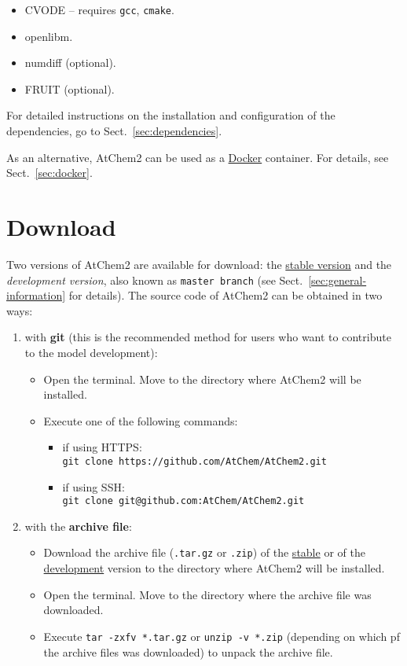 \begin{itemize}
\item CVODE -- requires \texttt{gcc}, \texttt{cmake}. %
\item openlibm.
\item numdiff (optional).
\item FRUIT (optional).
\end{itemize}

For detailed instructions on the installation and configuration of the
dependencies, go to Sect.~\ref{sec:dependencies}.

As an alternative, AtChem2 can be used as a \href{https://www.docker.com}{Docker}
container. For details, see Sect.~\ref{sec:docker}.

\section{Download} \label{sec:download}

Two versions of AtChem2 are available for download: the
\href{https://github.com/AtChem/AtChem2/releases}{stable version} and
the \emph{development version}, also known as \texttt{master\ branch}
(see Sect.~\ref{sec:general-information} for details). The source code
of AtChem2 can be obtained in two ways:

\begin{enumerate}
\item with \textbf{git} (this is the recommended method for users who
  want to contribute to the model development):
  \begin{itemize}
  \item Open the terminal. Move to the directory where AtChem2 will be
    installed.
  \item Execute one of the following commands:
    \begin{itemize}
      \item if using HTTPS:\\
        \verb|git clone https://github.com/AtChem/AtChem2.git|
      \item if using SSH:\\
        \verb|git clone git@github.com:AtChem/AtChem2.git|
    \end{itemize}
  \end{itemize}
\item with the \textbf{archive file}:
  \begin{itemize}
  \item Download the archive file (\texttt{.tar.gz} or \texttt{.zip}) of the
    \href{https://github.com/AtChem/AtChem2/releases}{stable} or of the
    \href{https://github.com/AtChem/AtChem2/archive/master.zip}{development}
    version to the directory where AtChem2 will be installed.
  \item Open the terminal. Move to the directory where the archive
    file was downloaded.
  \item Execute \verb|tar -zxfv *.tar.gz| or \verb|unzip -v *.zip|
    (depending on which pf the archive files  was downloaded) to unpack
    the archive file.
  \end{itemize}
\end{enumerate}

